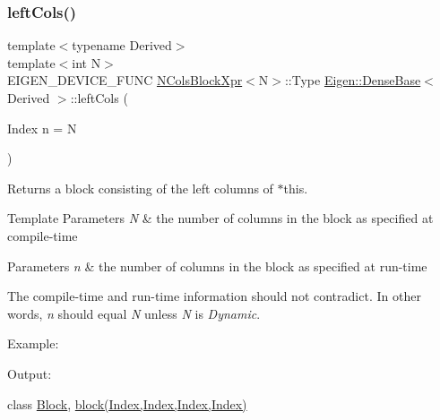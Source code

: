 \subsubsection{\texorpdfstring{leftCols()}{leftCols()}\hspace{0.1cm}{\footnotesize\ttfamily [2/2]}}
{\footnotesize\ttfamily template$<$typename Derived$>$ \\
template$<$int N$>$ \\
E\+I\+G\+E\+N\+\_\+\+D\+E\+V\+I\+C\+E\+\_\+\+F\+U\+NC \mbox{\hyperlink{struct_eigen_1_1_dense_base_1_1_n_cols_block_xpr}{N\+Cols\+Block\+Xpr}}$<$N$>$\+::Type \mbox{\hyperlink{class_eigen_1_1_dense_base}{Eigen\+::\+Dense\+Base}}$<$ Derived $>$\+::left\+Cols (\begin{DoxyParamCaption}\item[{Index}]{n = {\ttfamily N} }\end{DoxyParamCaption})\hspace{0.3cm}{\ttfamily [inline]}}

\begin{DoxyReturn}{Returns}
a block consisting of the left columns of $\ast$this.
\end{DoxyReturn}

\begin{DoxyTemplParams}{Template Parameters}
{\em N} & the number of columns in the block as specified at compile-\/time \\
\hline
\end{DoxyTemplParams}

\begin{DoxyParams}{Parameters}
{\em n} & the number of columns in the block as specified at run-\/time\\
\hline
\end{DoxyParams}
The compile-\/time and run-\/time information should not contradict. In other words, {\itshape n} should equal {\itshape N} unless {\itshape N} is {\itshape Dynamic}.

Example\+: 
\begin{DoxyCodeInclude}{0}
\end{DoxyCodeInclude}
 Output\+: 
\begin{DoxyVerbInclude}
\end{DoxyVerbInclude}
 class \mbox{\hyperlink{class_eigen_1_1_block}{Block}}, \mbox{\hyperlink{class_eigen_1_1_dense_base_ab8e42e67c5cfd5fa13e684642f0f65bf}{block(\+Index,\+Index,\+Index,\+Index)}} \mbox{\label{class_eigen_1_1_dense_base_a35f222d8834f34fd358f2ef7bb52c888}} 
